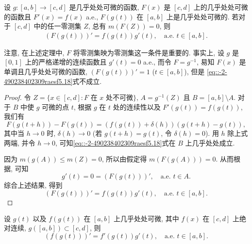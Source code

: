 \documentclass[../../main.tex]{subfiles}%
\begin{document}
\begin{theorem}[复合函数的微分]\label{theorem:实变函数--复合函数的微分}
设 $g: [a,b]\to[c,d]$ 是几乎处处可微的函数, $F(x)$ 是 $[c,d]$ 上的几乎处处可微的函数且 $F'(x)=f(x)$ a.e., $F(g(t))$ 在 $[a,b]$ 上是几乎处处可微的. 若对于 $[c,d]$ 中的任一零测集 $Z$, 总有 $m(F(Z))=0$, 则
\begin{align}
(F(g(t)))' = f(g(t))g'(t), \quad \text{a.e. } t\in[a,b]. \label{eq::-2-490238402309raesf5.18}
\end{align}
\end{theorem}
\begin{remark}
注意, 在上述定理中, $F$ 将零测集映为零测集这一条件是重要的. 事实上, 设 $g$ 是 $[0,1]$ 上的严格递增的连续函数且 $g'(t)=0$ a.e., 而令 $F = g^{-1}$, 易知 $F(x)$ 是单调且几乎处处可微的函数, $(F(g(t)))' = 1$ ($t\in[a,b]$), 但是 \eqref{eq::-2-490238402309raesf5.18}式不成立.
\end{remark}
\begin{proof}

令 $Z = \{x\in[c,d]: F \text{ 在 } x \text{ 处不可微}\}$, $A = g^{-1}(Z)$ 且 $B = [a,b]\setminus A$. 对于 $B$ 中使 $g$ 可微的点 $t$, 根据 $g$ 在 $t$ 处的连续性以及 $F'(g(t))=f(g(t))$, 我们有
\[
F(g(t+h)) - F(g(t)) = (f(g(t))+\delta(h))(g(t+h)-g(t)),
\]
其中当 $h\to 0$ 时, $\delta(h)\to 0$ (若 $g(t+h)=g(t)$, 令 $\delta(h)=0$). 用 $h$ 除上式两端, 并令 $h\to 0$, 可知\eqref{eq::-2-490238402309raesf5.18}式在 $B$ 上几乎处处成立.

因为 $m(g(A))\leqslant m(Z)=0$, 所以由假定得 $m(F(g(A)))=0$. 从而根据, 可知
\[
g'(t) = 0 = (F(g(t)))', \quad \text{a.e. } t\in A.
\]
综合上述结果, 得到
\[
(F(g(t)))' = f(g(t))g'(t), \quad \text{a.e. } t\in[a,b].
\]

\end{proof}

\begin{corollary}
设 $g(t)$ 以及 $f(g(t))$ 在 $[a,b]$ 上几乎处处可微, 其中 $f(x)$ 在 $[c,d]$ 上绝对连续, $g([a,b])\subset[c,d]$, 则
\[
(f(g(t)))' = f'(g(t))g'(t), \quad \text{a.e. } t\in[a,b].
\]
\end{corollary}
\end{document}
